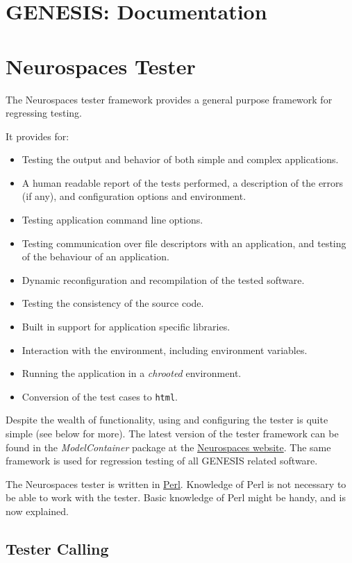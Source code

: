\documentclass[12pt]{article}
\begin{document}
\section*{GENESIS: Documentation}

\section*{Neurospaces Tester}

The Neurospaces tester framework provides a general purpose framework for regressing testing.

It provides for:
\begin{itemize}
\item Testing the output and behavior of both simple and complex applications.
\item A human readable report of the tests performed, a description of the errors (if any), and configuration options and environment.
\item Testing application command line options.
\item Testing communication over file descriptors with an application, and testing of the behaviour of an application.
\item Dynamic reconfiguration and recompilation of the tested software.
\item Testing the consistency of the source code.
\item Built in support for application specific libraries.
\item Interaction with the environment, including environment variables.
\item Running the application in a {\it chrooted} environment.
\item Conversion of the test cases to {\tt html}. 
\end{itemize}

Despite the wealth of functionality, using and configuring the tester is quite simple (see below for more). The latest version of the tester framework can be found in the {\it ModelContainer} package at the \href{http://www.neurospaces.org/}{Neurospaces website}. The same framework is used for regression testing of all GENESIS related software.

The Neurospaces tester is written in \href{http://www.perl.org/}{Perl}. Knowledge of Perl is not necessary to be able to work with the tester. Basic knowledge of Perl might be handy, and is now explained.

\subsection*{Tester Calling}
\end{document}
